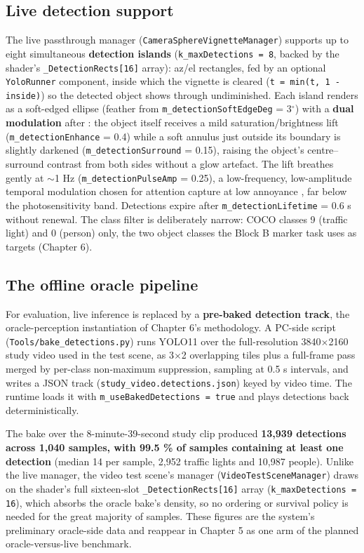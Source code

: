 \subsection{Live detection support}

The live passthrough manager (\verb|CameraSphereVignetteManager|) supports up to eight simultaneous
\textbf{detection islands} (\verb|k_maxDetections = 8|, backed by the shader's \verb|_DetectionRects[16]| array):
az/el rectangles, fed by an optional \verb|YoloRunner| component, inside which the vignette is cleared
(\verb|t = min(t, 1 - inside)|) so the detected object shows through undiminished. Each island renders as
a soft-edged ellipse (feather from \verb|m_detectionSoftEdgeDeg| = 3$^{\circ}$) with a \textbf{dual modulation} after
\citet{veas2011}: the object itself receives a mild saturation/brightness lift
(\verb|m_detectionEnhance| = 0.4) while a soft annulus just outside its boundary is slightly darkened
(\verb|m_detectionSurround| = 0.15), raising the object's centre–surround contrast from both sides
without a glow artefact. The lift breathes gently at $\sim$1 Hz (\verb|m_detectionPulseAmp| = 0.25), a
low-frequency, low-amplitude temporal modulation chosen for attention capture at low annoyance
\citep{waldner2014}, far below the photosensitivity band. Detections expire after
\verb|m_detectionLifetime| = 0.6 s without renewal. The class filter is deliberately narrow: COCO
classes 9 (traffic light) and 0 (person) only, the two object classes the Block B marker task uses
as targets (Chapter 6).

\subsection{The offline oracle pipeline}

For evaluation, live inference is replaced by a \textbf{pre-baked detection track}, the oracle-perception
instantiation of Chapter 6's methodology. A PC-side script (\verb|Tools/bake_detections.py|) runs YOLO11
over the full-resolution 3840$\times$2160 study video used in the test scene, as 3$\times$2 overlapping tiles
plus a full-frame pass merged by per-class non-maximum suppression, sampling at 0.5 s intervals, and
writes a JSON track (\verb|study_video.detections.json|) keyed by video time. The runtime loads it with
\verb|m_useBakedDetections = true| and plays detections back deterministically.

The bake over the 8-minute-39-second study clip produced
\textbf{13,939 detections across 1,040 samples, with 99.5 \% of samples containing at least one
detection} (median 14 per sample, 2,952 traffic lights and 10,987 people). Unlike the live manager, the
video test scene's manager (\verb|VideoTestSceneManager|) draws on the shader's full sixteen-slot
\verb|_DetectionRects[16]| array (\verb|k_maxDetections = 16|), which absorbs the oracle bake's density,
so no ordering or survival policy is needed for the great majority of samples. These figures are the system's preliminary oracle-side data and reappear in Chapter 5 as
one arm of the planned oracle-versus-live benchmark.

